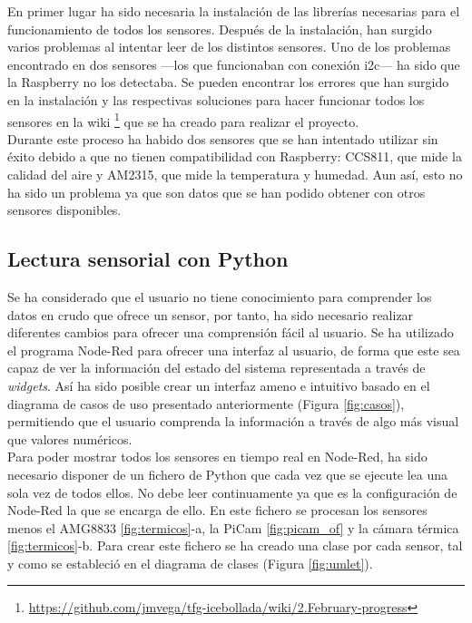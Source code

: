 En primer lugar ha sido necesaria la instalación de las librerías necesarias para el funcionamiento de todos los sensores. Después de la instalación, han surgido varios problemas al intentar leer de los distintos sensores. Uno de los problemas encontrado en dos sensores ---los que funcionaban con conexión i2c--- ha sido que la Raspberry no los detectaba. Se pueden encontrar los errores que han surgido en la instalación y las respectivas soluciones para hacer funcionar todos los sensores en la wiki \footnote{\url{https://github.com/jmvega/tfg-icebollada/wiki/2.February-progress}} que se ha creado para realizar el proyecto.\\

Durante este proceso ha habido dos sensores que se han intentado utilizar sin éxito debido a que no tienen compatibilidad con Raspberry: CCS811, que mide la calidad del aire y AM2315, que mide la temperatura y humedad. Aun así, esto no ha sido un problema ya que son datos que se han podido obtener con otros sensores disponibles.\\

\subsection{Lectura sensorial con Python}
\label{sec:ficheropython}
Se ha considerado que el usuario no tiene conocimiento para comprender los datos en crudo que ofrece un sensor, por tanto, ha sido necesario realizar diferentes cambios para ofrecer una comprensión fácil al usuario. Se ha utilizado el programa Node-Red para ofrecer una interfaz al usuario, de forma que este sea capaz de ver la información del estado del sistema representada a través de \textit{widgets}. Así ha sido posible crear un interfaz ameno e intuitivo basado en el diagrama de casos de uso presentado anteriormente (Figura \ref{fig:casos}), permitiendo que el usuario comprenda la información a través de algo más visual que valores numéricos.\\

Para poder mostrar todos los sensores en tiempo real en Node-Red, ha sido necesario disponer de un fichero de Python que cada vez que se ejecute lea una sola vez de todos ellos. No debe leer continuamente ya que es la configuración de Node-Red la que se encarga de ello. En este fichero se procesan los sensores menos el AMG8833 \ref{fig:termicos}-a, la PiCam \ref{fig:picam_of} y la cámara térmica \ref{fig:termicos}-b. Para crear este fichero se ha creado una clase por cada sensor, tal y como se estableció en el diagrama de clases (Figura \ref{fig:umlet}).\\

